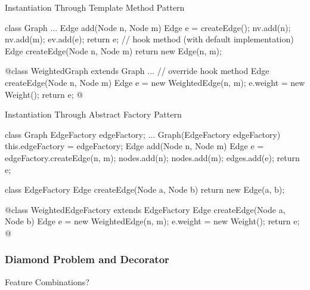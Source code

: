 \begin{frame}[fragile]{Instantiation Through Template Method Pattern}
	\small
	\begin{fancycolumns}[widths={45}]
\begin{codetight}{}
class Graph {
	...
	Edge add(Node n, Node m) {
		Edge e = createEdge();
		nv.add(n); nv.add(m); ev.add(e);
		return e;
	}
	// hook method (with default implementation)
	Edge createEdge(Node n, Node m) {
		return new Edge(n, m);
	}
}
\end{codetight}
\begin{codetight}{}
@class WeightedGraph extends Graph {
	...
	// override hook method
	Edge createEdge(Node n, Node m) {
		Edge e = new WeightedEdge(n, m);
		e.weight = new Weight();
		return e;
	}
}@
\end{codetight}
	\nextcolumn
		\centering{}
	\end{fancycolumns}
\end{frame}

\begin{frame}[fragile]{Instantiation Through Abstract Factory Pattern}
	\small
	\begin{fancycolumns}[b]
\begin{codetight}{}
class Graph {
	EdgeFactory edgeFactory;
	...
	Graph(EdgeFactory edgeFactory) {
		this.edgeFactory = edgeFactory;
	}
	Edge add(Node n, Node m) {
		Edge e = edgeFactory.createEdge(n, m);
		nodes.add(n); nodes.add(m); edges.add(e);
		return e;
	}
}
\end{codetight}
\begin{codetight}{}
class EdgeFactory {
	Edge createEdge(Node a, Node b) {
		return new Edge(a, b);
	}
}
\end{codetight}
	\nextcolumn
		\centering{}	
\begin{codetight}{}
@class WeightedEdgeFactory extends EdgeFactory {
	Edge createEdge(Node a, Node b) {
		Edge e = new WeightedEdge(n, m);
		e.weight = new Weight();
		return e;
	}
}@
\end{codetight}
	\end{fancycolumns}
\end{frame}

\subsubsection{Diamond Problem and Decorator}
\begin{frame}{Feature Combinations?}
	\centering{}
\end{frame}


